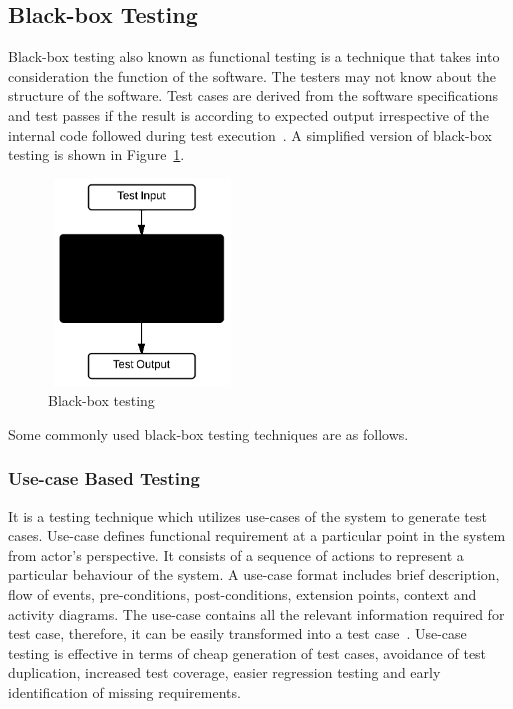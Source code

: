 \subsection{Black-box Testing}
Black-box testing also known as functional testing is a technique that takes into consideration the function of the software. The testers may not know about the structure of the software. Test cases are derived from the software specifications and test passes if the result is according to expected output irrespective of the internal code followed during test execution~\cite{beizer1995black}. A simplified version of black-box testing is shown in Figure~\ref{fig:blackBox}.
\bigskip
\begin{figure}[h]
\begin{center}
	\includegraphics[width=5cm, height=5.5cm ]{chapter2/blackBox.png}
	\bigskip
	\caption{Black-box testing}
 	\label{fig:blackBox}
\end{center}  
\end{figure}
\bigskip

Some commonly used black-box testing techniques are as follows.

\subsubsection{Use-case Based Testing}
It is a testing technique which utilizes use-cases of the system to generate test cases. Use-case defines functional requirement at a particular point in the system from actor's perspective. It consists of a sequence of actions to represent a particular behaviour of the system. A use-case format includes brief description, flow of events, pre-conditions, post-conditions, extension points, context and activity diagrams. The use-case contains all the relevant information required for test case, therefore, it can be easily transformed into a test case~\cite{armour2000advanced}. Use-case testing is effective in terms of cheap generation of test cases, avoidance of test duplication, increased test coverage, easier regression testing and early identification of missing requirements.  

